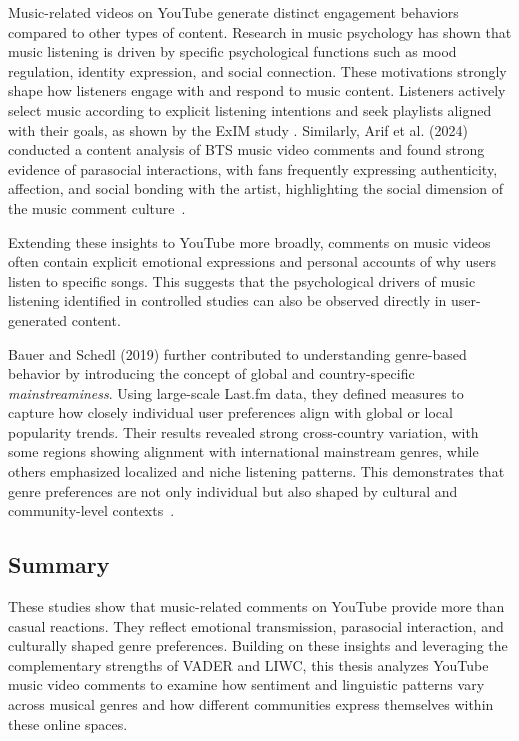 Music-related videos on YouTube generate distinct engagement behaviors compared to other types of content. Research in music psychology has shown that music listening is driven by specific psychological functions such as mood regulation, identity expression, and social connection. These motivations strongly shape how listeners engage with and respond to music content.
Listeners actively select music according to explicit listening intentions and seek playlists aligned with their goals, as shown by the ExIM study \cite{hausberger2025exim}.
Similarly, Arif et al. (2024) conducted a content analysis of BTS music video comments and found strong evidence of parasocial interactions, with fans frequently expressing authenticity, affection, and social bonding with the artist, highlighting the social dimension of the music comment culture~\cite{arif2024parasocial}.

Extending these insights to YouTube more broadly, comments on music videos often contain explicit emotional expressions and personal accounts of why users listen to specific songs. This suggests that the psychological drivers of music listening identified in controlled studies can also be observed directly in user-generated content.

Bauer and Schedl (2019) further contributed to understanding genre-based behavior by introducing the concept of global and country-specific \textit{mainstreaminess}. Using large-scale Last.fm data, they defined measures to capture how closely individual user preferences align with global or local popularity trends. Their results revealed strong cross-country variation, with some regions showing alignment with international mainstream genres, while others emphasized localized and niche listening patterns. This demonstrates that genre preferences are not only individual but also shaped by cultural and community-level contexts~\cite{bauer2019mainstreaminess}.

\subsection*{Summary}

 These studies show that music-related comments on YouTube provide more than casual reactions. They reflect emotional transmission, parasocial interaction, and culturally shaped genre preferences. Building on these insights and leveraging the complementary strengths of VADER and LIWC, this thesis analyzes YouTube music video comments to examine how sentiment and linguistic patterns vary across musical genres and how different communities express themselves within these online spaces.